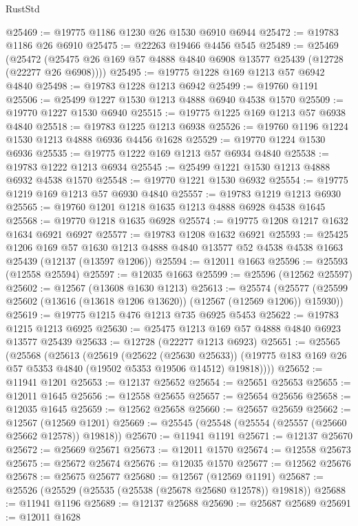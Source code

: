 \begin{lexlean}{RustStd}
\begin{coremodule}
@25469 := @19775 @1186 @1230 @26 @1530 @6910 @6944
@25472 := @19783 @1186 @26 @6910
@25475 := @22263 @19466 @4456 @545
@25489 := @25469
    (@25472 (@25475 @26 @169 @57 @4888 @4840 @6908 @13577 @25439 (@12728 (@22277 @26 @6908))))
@25495 := @19775 @1228 @169 @1213 @57 @6942 @4840
@25498 := @19783 @1228 @1213 @6942
@25499 := @19760 @1191
@25506 := @25499 @1227 @1530 @1213 @4888 @6940 @4538 @1570
@25509 := @19770 @1227 @1530 @6940
@25515 := @19775 @1225 @169 @1213 @57 @6938 @4840
@25518 := @19783 @1225 @1213 @6938
@25526 := @19760 @1196 @1224 @1530 @1213 @4888 @6936 @4456 @1628
@25529 := @19770 @1224 @1530 @6936
@25535 := @19775 @1222 @169 @1213 @57 @6934 @4840
@25538 := @19783 @1222 @1213 @6934
@25545 := @25499 @1221 @1530 @1213 @4888 @6932 @4538 @1570
@25548 := @19770 @1221 @1530 @6932
@25554 := @19775 @1219 @169 @1213 @57 @6930 @4840
@25557 := @19783 @1219 @1213 @6930
@25565 := @19760 @1201 @1218 @1635 @1213 @4888 @6928 @4538 @1645
@25568 := @19770 @1218 @1635 @6928
@25574 := @19775 @1208 @1217 @1632 @1634 @6921 @6927
@25577 := @19783 @1208 @1632 @6921
@25593 := @25425
    @1206
    @169
    @57
    @1630
    @1213
    @4888
    @4840
    @13577
    @52
    @4538
    @4538
    @1663
    @25439
    (@12137 (@13597 @1206))
@25594 := @12011 @1663
@25596 := @25593 (@12558 @25594)
@25597 := @12035 @1663
@25599 := @25596 (@12562 @25597)
@25602 := @12567 (@13608 @1630 @1213)
@25613 := @25574
    (@25577 (@25599 @25602 (@13616 (@13618 @1206 @13620)) (@12567 (@12569 @1206)) @15930))
@25619 := @19775 @1215 @476 @1213 @735 @6925 @5453
@25622 := @19783 @1215 @1213 @6925
@25630 := @25475 @1213 @169 @57 @4888 @4840 @6923 @13577 @25439
@25633 := @12728 (@22277 @1213 @6923)
@25651 := @25565
    (@25568
      (@25613
        (@25619
          (@25622 (@25630 @25633))
          (@19775 @183 @169 @26 @57 @5353 @4840 (@19502 @5353 @19506 @14512) @19818))))
@25652 := @11941 @1201
@25653 := @12137 @25652
@25654 := @25651 @25653
@25655 := @12011 @1645
@25656 := @12558 @25655
@25657 := @25654 @25656
@25658 := @12035 @1645
@25659 := @12562 @25658
@25660 := @25657 @25659
@25662 := @12567 (@12569 @1201)
@25669 := @25545 (@25548 (@25554 (@25557 (@25660 @25662 @12578)) @19818))
@25670 := @11941 @1191
@25671 := @12137 @25670
@25672 := @25669 @25671
@25673 := @12011 @1570
@25674 := @12558 @25673
@25675 := @25672 @25674
@25676 := @12035 @1570
@25677 := @12562 @25676
@25678 := @25675 @25677
@25680 := @12567 (@12569 @1191)
@25687 := @25526 (@25529 (@25535 (@25538 (@25678 @25680 @12578)) @19818))
@25688 := @11941 @1196
@25689 := @12137 @25688
@25690 := @25687 @25689
@25691 := @12011 @1628

\end{coremodule}
\end{lexlean}
